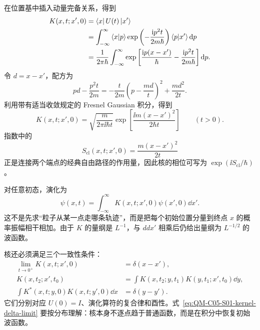 
在位置基中插入动量完备关系，得到
\begin{align}
  K(x,t;x',0)
  &=\left\langle x\right|U(t)\left|x'\right\rangle
  \notag\\
  &=\int_{-\infty}^{\infty}
  \left\langle x \middle| p \right\rangle
  \exp\left(-\frac{\mathrm{i} p^2t}{2m\hbar}\right)
  \left\langle p \middle| x' \right\rangle\mathop{}\!\mathrm{d} p
  \notag\\
  &=\frac{1}{2\pi\hbar}
  \int_{-\infty}^{\infty}
  \exp\left[
    \frac{\mathrm{i} p(x-x')}{\hbar}
    -\frac{\mathrm{i} p^2t}{2m\hbar}
  \right]\mathop{}\!\mathrm{d} p.
  \label{eq:QM-C05-S01-kernel-momentum-integral}
\end{align}
令 $d=x-x'$，配方为
\begin{equation}
  pd-\frac{p^2t}{2m}
  =-\frac{t}{2m}\left(p-\frac{md}{t}\right)^2
  +\frac{md^2}{2t}.
  \label{eq:QM-C05-S01-kernel-complete-square}
\end{equation}
利用带有适当收敛规定的 Fresnel Gaussian 积分，得到
\begin{equation}
  \boxed{
  K(x,t;x',0)
  =\sqrt{\frac{m}{2\pi\ii\hbar t}}
  \exp\left[
    \frac{\ii m(x-x')^2}{2\hbar t}
  \right]}
  \qquad(t>0).
  \label{eq:QM-C05-S01-free-kernel}
\end{equation}
指数中的
\begin{equation}
  S_{\mathrm{cl}}(x,t;x',0)
  =\frac{m(x-x')^2}{2t}
  \label{eq:QM-C05-S01-free-classical-action}
\end{equation}
正是连接两个端点的经典自由路径的作用量，因此核的相位可写为 $\exp(\ii S_{\mathrm{cl}}/\hbar)$。

对任意初态，演化为
\begin{equation}
  \boxed{
  \psi(x,t)=\int_{-\infty}^{\infty}
  K(x,t;x',0)\psi(x',0)\dd x'}.
  \label{eq:QM-C05-S01-kernel-evolution}
\end{equation}
这不是先求“粒子从某一点走哪条轨迹”，而是把每个初始位置分量到终点 $x$ 的概率振幅相干相加。由于 $K$ 的量纲是 $L^{-1}$，与 $dd x'$ 相乘后仍给出量纲为 $L^{-1/2}$ 的波函数。

核还必须满足三个一致性条件：
\begin{align}
  \lim_{t\to0^+}K(x,t;x',0)&=\delta(x-x'),
  \label{eq:QM-C05-S01-kernel-delta-limit}\\
  K(x,t_2;x',t_0)
  &=\int K(x,t_2;y,t_1)K(y,t_1;x',t_0)\dd y,
  \label{eq:QM-C05-S01-kernel-composition}\\
  \int K^*(x,t;y,0)K(x,t;y',0)\dd x
  &=\delta(y-y').
  \label{eq:QM-C05-S01-kernel-unitarity}
\end{align}
它们分别对应 $U(0)=I$、演化算符的复合律和酉性。式~\eqref{eq:QM-C05-S01-kernel-delta-limit} 要按分布理解：核本身不逐点趋于普通函数，而是在积分中恢复初始波函数。

